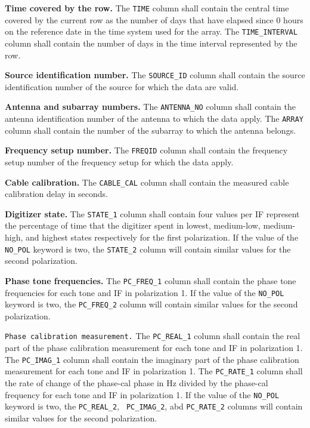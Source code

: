 \documentclass[twoside]{article}
\begin{document}
{\bf Time covered by the row.}  The {\tt TIME} column shall contain
the central time covered by the current row as the number of days
that have elapsed since 0 hours on the reference date in the time
system used for the array.  The {\tt TIME\_INTERVAL} column shall
contain the number of days in the time interval represented by the
row.

{\bf Source identification number.}  The {\tt SOURCE\_ID} column shall
contain the source identification number of the source for which the
data are valid.

{\bf Antenna and subarray numbers.}  The {\tt ANTENNA\_NO} column
shall contain the antenna identification number of the antenna to
which the data apply.  The {\tt ARRAY} column shall contain the
number of the subarray to which the antenna belongs.

{\bf Frequency setup number.}  The {\tt FREQID} column shall contain
the frequency setup number of the frequency setup for which the data
apply.

{\bf Cable calibration.} The {\tt CABLE\_CAL} column shall contain the
measured cable calibration delay in seconds.

{\bf Digitizer state.} The {\tt STATE\_1} column shall contain four
values per IF represent the percentage of time that the digitizer
spent in lowest, medium-low, medium-high, and highest states
respectively for the first polarization.  If the value of the {\tt
  NO\_POL} keyword is two, the {\tt STATE\_2} column will contain
similar values for the second polarization.

{\bf Phase tone frequencies.} The {\tt PC\_FREQ\_1} column shall
contain the phase tone frequencies for each tone and IF in
polarization 1.    If the value of the {\tt NO\_POL} keyword is two,
the {\tt PC\_FREQ\_2} column will contain similar values for the
second polarization.

{\tt Phase calibration measurement.} The {\tt PC\_REAL\_1} column
shall contain the real part of the phase calibration measurement for
each tone and IF in polarization 1.  The {\tt PC\_IMAG\_1} column
shall contain the imaginary part of the phase calibration measurement
for each tone and IF in polarization 1.  The {\tt PC\_RATE\_1} column
shall the rate of change of the phase-cal phase in Hz divided by the
phase-cal frequency for each tone and IF in polarization 1.  If the
value of the {\tt NO\_POL} keyword is two, the {\tt PC\_REAL\_2}, {\tt
  PC\_IMAG\_2}, abd {\tt PC\_RATE\_2} columns will contain similar
values for the second polarization.
\end{document}
